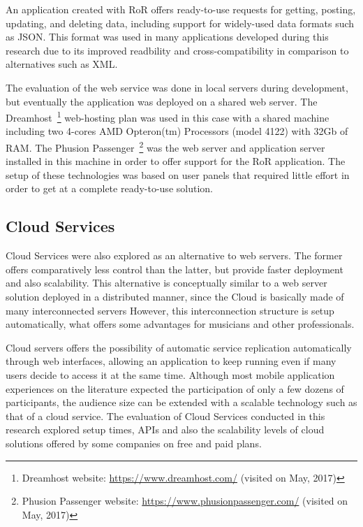 An application created with RoR offers ready-to-use requests for getting, posting, updating, and deleting data, including support for widely-used data formats such as JSON.
This format was used in many applications developed during this research due to its improved readbility and cross-compatibility in comparison to alternatives such as XML.

The evaluation of the web service was done in local servers during development, but eventually the application was deployed on a shared web server.
The Dreamhost~\footnote{Dreamhost website: \url{https://www.dreamhost.com/} (visited on May, 2017)} web-hosting plan was used in this case with a shared machine including two 4-cores AMD Opteron(tm) Processors (model 4122) with 32Gb of RAM. 
The Phusion Passenger~\footnote{Phusion Passenger website: \url{https://www.phusionpassenger.com/} (visited on May, 2017)} was the web server and application server installed in this machine in order to offer support for the RoR application.
The setup of these technologies was based on user panels that required little effort in order to get at a complete ready-to-use solution.

\subsection*{Cloud Services}

Cloud Services were also explored as an alternative to web servers.
The former offers comparatively less control than the latter, but provide faster deployment and also scalability.
This alternative is conceptually similar to a web server solution deployed in a distributed manner, since the Cloud is basically made of many interconnected servers
However, this interconnection structure is setup automatically, what offers some advantages for musicians and other professionals. 

Cloud servers offers the possibility of automatic service replication automatically through web interfaces, allowing an application to keep running even if many users decide to access it at the same time.
Although most mobile application experiences on the literature expected the participation of only a few dozens of participants, the audience size can be extended with a scalable technology such as that of a cloud service.
The evaluation of Cloud Services conducted in this research explored setup times, APIs and also the scalability levels of cloud solutions offered by some companies on free and paid plans. 

